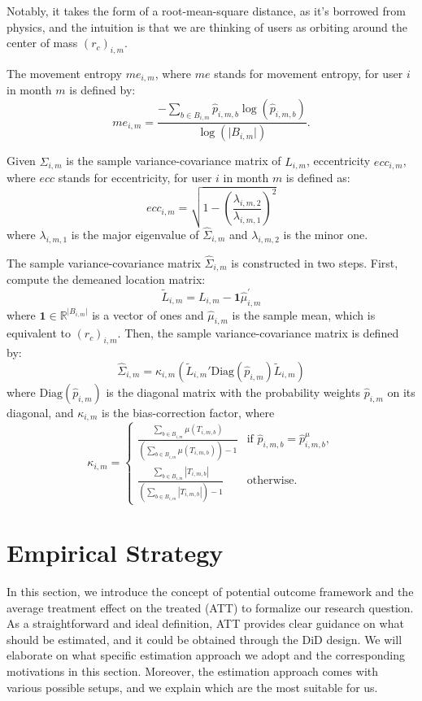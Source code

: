 Notably, it takes the form of a root-mean-square distance, as it's borrowed from physics, and the intuition is that we are thinking of users as orbiting around the center of mass $(r_c)_{i, m}$.


\clearpage\newpage
\begin{definition}
The movement entropy $me_{i, m}$, where $me$ stands for movement entropy, for user $i$ in month $m$ is defined by:
\[
me_{i, m}
=
\frac{
- \sum_{b \in B_{i, m}}
    \hat{p}_{i, m, b}
    \log(\hat{p}_{i, m, b})
}{
\log(\lvert B_{i, m} \rvert )
}.
\]
\end{definition}


\begin{definition}[Eccentricity]
Given $\hat{\Sigma}_{i, m}$ is the sample variance-covariance matrix of $L_{i, m}$, eccentricity $ecc_{i, m}$, where $ecc$ stands for eccentricity, for user $i$ in month $m$ is defined as:
\[
ecc_{i, m}
=
\sqrt{
    1
    -
    \left(
        \frac{\lambda_{i, m, 2}}{\lambda_{i, m, 1}}
    \right)^2
}
\]
where $\lambda_{i, m, 1}$ is the major eigenvalue of $\hat{\Sigma}_{i, m}$ and $\lambda_{i, m, 2}$ is the minor one.
\end{definition}

The sample variance-covariance matrix $\hat{\Sigma}_{i, m}$ is constructed in two steps.
First, compute the demeaned location matrix:
\[
\tilde{L}_{i, m}
=
L_{i, m}
-
\mathbf{1}\hat{\mu}_{i, m}^{'}
\]
where $\mathbf{1} \in \mathbb{R}^{\lvert B_{i, m} \rvert }$ is a vector of ones and $\hat{\mu}_{i, m}$ is the sample mean, which is equivalent to $(r_c)_{i, m}$.
Then, the sample variance-covariance matrix is defined by:
\[
\hat{\Sigma}_{i, m}
=
\kappa_{i, m} (
    \tilde{L}_{i, m}'
    \text{Diag}(\hat{p}_{i, m})
    \tilde{L}_{i, m}
)
\]
where $\text{Diag}(\hat{p}_{i, m})$ is the diagonal matrix with the probability weights $\hat{p}_{i, m}$ on its diagonal, and $\kappa_{i, m}$ is the bias-correction factor, where
\[
\kappa_{i, m} =
\begin{cases}
\frac{
\sum_{b \in B_{i, m}} \mu(T_{i, m, b})
}{
\left( \sum_{b \in B_{i, m}} \mu(T_{i, m, b}) \right) - 1
} & \text{if } \hat{p}_{i, m, b} = \hat{p}^{\mu}_{i, m, b}, \\[0.5em]
\frac{
\sum_{b \in B_{i, m}} |T_{i, m, b}|
}{
\left( \sum_{b \in B_{i, m}} |T_{i, m, b}| \right) - 1
} & \text{otherwise}.
\end{cases}
\]



\clearpage\newpage
\section{Empirical Strategy}
In this section, we introduce the concept of potential outcome framework and the average treatment effect on the treated (ATT) to formalize our research question.
As a straightforward and ideal definition, ATT provides clear guidance on what should be estimated, and it could be obtained through the DiD design.
We will elaborate on what specific estimation approach we adopt and the corresponding motivations in this section.
Moreover, the estimation approach comes with various possible setups, and we explain which are the most suitable for us.

